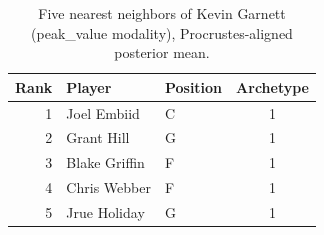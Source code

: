 \begin{table}[htbp]
  \centering\small
  \begin{tabular}{rllc}
    \toprule
    Rank & Player & Position & Archetype \\
    \midrule
    1 & Joel Embiid & C & 1 \\
    2 & Grant Hill & G & 1 \\
    3 & Blake Griffin & F & 1 \\
    4 & Chris Webber & F & 1 \\
    5 & Jrue Holiday & G & 1 \\
    \bottomrule
  \end{tabular}
  \caption{Five nearest neighbors of Kevin Garnett (peak_value modality), Procrustes-aligned posterior mean.}
  \label{tab:Kevin_Garnett_neighbors_peak_value}
\end{table}

